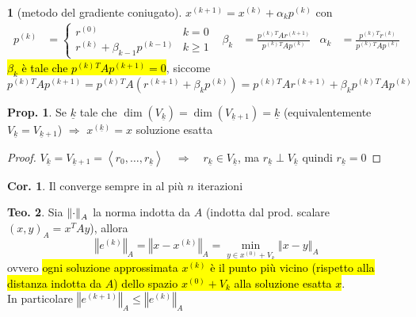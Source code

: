 \documentclass[a4paper,10pt]{article}
\theoremstyle{definition}
\theoremstyle{indentdefinition}
\theoremstyle{indenttheorem}
\newtheorem{thm}{Teo.}
\newtheorem{prop}{Prop.}
\newtheorem{cor}{Cor.}
\theoremstyle{myremark}
\theoremstyle{indentgeneral}
\newtheorem{lyxalgorithm}[thm]{\protect\algorithmname}
\theoremstyle{plain}
\theoremstyle{plain}
\newenvironment{myboxed} 
{\noindent\begin{lrbox}{\mybox}\begin{minipage}{\textwidth}}
{\end{minipage}\end{lrbox}\fbox{\usebox{\mybox}}}
\begin{document}
\begin{lyxalgorithm}[metodo del gradiente coniugato]
\label{def:metodo-del-gradiente-coniugato}$x^{\left(k+1\right)}=x^{\left(k\right)}+\alpha_{k}p^{\left(k\right)}$
con 
\begin{align*}
p^{\left(k\right)} & =\begin{cases}
r^{\left(0\right)} & k=0\\
r^{\left(k\right)}+\beta_{k-1}p^{\left(k-1\right)} & k\geq1
\end{cases} & \beta_{k} & =\frac{p^{\left(k\right)}{}^{T}Ar^{\left(k+1\right)}}{p^{\left(k\right)}{}^{T}Ap^{\left(k\right)}} & \alpha_{k} & =\frac{p^{\left(k\right)}{}^{T}r^{\left(k\right)}}{p^{\left(k\right)}{}^{T}Ap^{\left(k\right)}}
\end{align*}
\hl{$\beta_{k}$ è tale che $p^{\left(k\right)}{}^{T}Ap^{\left(k+1\right)}=0$},
siccome $p^{\left(k\right)}{}^{T}Ap^{\left(k+1\right)}=p^{\left(k\right)}{}^{T}A\left(r^{\left(k+1\right)}+\beta_{k}p^{\left(k\right)}\right)=p^{\left(k\right)}{}^{T}Ar^{\left(k+1\right)}+\beta_{k}p^{\left(k\right)}{}^{T}Ap^{\left(k\right)}$
\end{lyxalgorithm}

\begin{myboxed}
\begin{prop}
Se $\underline{k}$ tale che $\dim\left(V_{\underline{k}}\right)=\dim\left(V_{\underline{k}+1}\right)=\underline{k}$
(equivalentemente $V_{\underline{k}}=V_{\underline{k}+1}$) $\Longrightarrow$
$x^{\left(\underline{k}\right)}=x$ soluzione esatta
\end{prop}
\end{myboxed}

\begin{proof}
$V_{\underline{k}}=V_{\underline{k}+1}=\left\langle r_0,\dots,r_{\underline{k}}\right\rangle\quad\Longrightarrow\quad r_{\underline{k}}\in V_{\underline{k}}$,
ma $r_{\underline{k}}\perp V_{\underline{k}}$ quindi $r_{\underline{k}}=0$
\end{proof}

\begin{myboxed}
\begin{cor}
Il  converge sempre in
al più $n$ iterazioni
\end{cor}
\end{myboxed}

\begin{myboxed}
\begin{thm} Sia $\norm{\cdot}_A$ la norma indotta da $A$ (indotta dal prod. scalare $(x,y)_A=x^TAy$), allora
$$\left\Vert e^{\left(k\right)}\right\Vert _{A}=\left\Vert x-x^{\left(k\right)}\right\Vert _{A}=\min_{y\in x^{\left(0\right)}+V_{k}}\left\Vert x-y\right\Vert _{A}$$
ovvero \hl{ogni soluzione approssimata $x^{\left(k\right)}$ è il punto più vicino (rispetto alla distanza indotta da $A$) dello spazio $x^{\left(0\right)}+V_{k}$ alla soluzione esatta $x$}. \\
In particolare $\left\Vert e^{\left(k+1\right)}\right\Vert _{A}\leq\left\Vert e^{\left(k\right)}\right\Vert _{A}$
\end{thm}
\end{myboxed}
\end{document}
